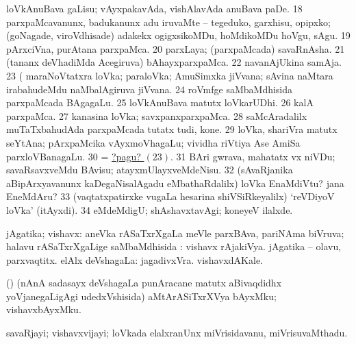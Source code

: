  loVkAnuBava gaLisu; vAyxpakavAda, vishAlavAda anuBava paDe. 
\eanum
\numie
\num{18}  parxpaMcavanunx, badukanunx adu iruvaMte -- tegeduko, garxhisu, opipxko; (goNagade, viroVdhisade) adakekx ogigxsikoMDu, hoMdikoMDu hoVgu, sAgu. 
\num{19}  pArxciVna, purAtana parxpaMca. 
\num{20}  parxLaya; (parxpaMcada) savaRnAsha. 
\num{21}  (tananx deVhadiMda Acegiruva) bAhayxparxpaMca. 
\num{22}  navanAjUkina samAja. 
\hypertarget{world pagu23}{} 
\num{23}  (  maraNoVtatxra loVka; paraloVka; AmuSimxka jiVvana; sAvina naMtara irabahudeMdu naMbalAgiruva jiVvana. 
\num{24}  roVmfge saMbaMdhisida parxpaMcada BAgagaLu. 
\num{25}  loVkAnuBava matutx loVkarUDhi. 
\num{26}  kalA parxpaMca. 
\num{27}  kanasina loVka; savxpanxparxpaMca. 
\num{28}  saMcAradalilx muTaTxbahudAda parxpaMcada tutatx tudi, kone. 
\num{29}  loVka, shariVra matutx seYtAna; pArxpaMcika vAyxmoVhagaLu; vividha riVtiya Ase AmiSa parxloVBanagaLu. 
\num{30}  = \hyperlink{world pagu23}{?pagu? \((23)\)}. 
\num{31}  BAri gwrava, mahatatx vx niVDu; savaRsavxveMdu BAvisu; atayxmUlayxveMdeNisu. 
\num{32}  (sAvaRjanika aBipArxyavanunx kaDegaNisalAgadu eMbathaRdalilx) loVka EnaMdiVtu? jana EneMdAru? 
\num{33}  (vaqtatxpatirxke \mo vugaLa hesarina shiVSiRkeyalilx) `reVDiyoV loVka' (itAyxdi). 
\num{34}  eMdeMdigU; shAshavxtavAgi; koneyeV ilalxde. 
\enum
\emng
\eentry

\bentry
{} 
\gl{\gu}
\expl{}
\bmng
jAgatika; vishavx: 
\banum
{} aneVka rASaTxrXgaLa meVle parxBAva, pariNAma biVruva; halavu rASaTxrXgaLige saMbaMdhisida :  vishavx rAjakiVya.  jAgatika -- olavu, parxvaqtitx. 
 elAlx deVshagaLa:  jagadivxVra.  vishavxdAKale. 
\eanum
\emng
\eentry

\bentry
{} 
\gl{\nA}
\expl{}
\bmng
(\AmA) (nAnA sadasayx deVshagaLa punAracane matutx aBivaqdidhx yoVjanegaLigAgi udedxVshisida) aMtArASiTxrXVya bAyxMku; vishavxbAyxMku. 
\emng
\eentry

\bentry
{} 
\gl{\nA}
\expl{}
\bmng
savaRjayi; vishavxvijayi; loVkada elalxranUnx miVrisidavanu, miVrisuvaMthadu. 
\emng
\eentry

